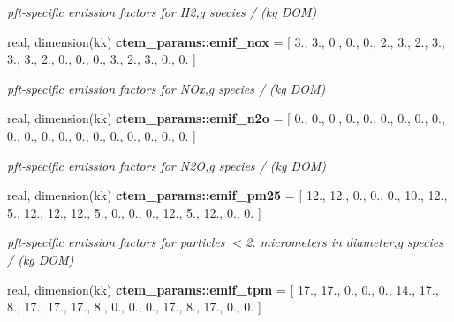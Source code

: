 \begin{DoxyCompactItemize}
\begin{DoxyCompactList}\small\item\em pft-\/specific emission factors for H2,g species / (kg D\+O\+M) \end{DoxyCompactList}\item 
\hypertarget{namespacectem__params_a1c3efd30262fdc33811b8179c691fa23}{}real, dimension(kk) {\bfseries ctem\+\_\+params\+::emif\+\_\+nox} = \mbox{[} 3., 3., 0., 0., 0., 2., 3., 2., 3., 3., 3., 2., 0., 0., 0., 3., 2., 3., 0., 0. \mbox{]}\label{namespacectem__params_a1c3efd30262fdc33811b8179c691fa23}

\begin{DoxyCompactList}\small\item\em pft-\/specific emission factors for N\+Ox,g species / (kg D\+O\+M) \end{DoxyCompactList}\item 
\hypertarget{namespacectem__params_a6b6a432b4e081591d12a9699cadd5c19}{}real, dimension(kk) {\bfseries ctem\+\_\+params\+::emif\+\_\+n2o} = \mbox{[} 0., 0., 0., 0., 0., 0., 0., 0., 0., 0., 0., 0., 0., 0., 0., 0., 0., 0., 0., 0. \mbox{]}\label{namespacectem__params_a6b6a432b4e081591d12a9699cadd5c19}

\begin{DoxyCompactList}\small\item\em pft-\/specific emission factors for N2\+O,g species / (kg D\+O\+M) \end{DoxyCompactList}\item 
\hypertarget{namespacectem__params_a89f38c6366d839a93b4cb499ecb49b6b}{}real, dimension(kk) {\bfseries ctem\+\_\+params\+::emif\+\_\+pm25} = \mbox{[} 12., 12., 0., 0., 0., 10., 12., 5., 12., 12., 12., 5., 0., 0., 0., 12., 5., 12., 0., 0. \mbox{]}\label{namespacectem__params_a89f38c6366d839a93b4cb499ecb49b6b}

\begin{DoxyCompactList}\small\item\em pft-\/specific emission factors for particles $<$2. micrometers in diameter,g species / (kg D\+O\+M) \end{DoxyCompactList}\item 
\hypertarget{namespacectem__params_a963896fb7e7da4daecc87391c68c903e}{}real, dimension(kk) {\bfseries ctem\+\_\+params\+::emif\+\_\+tpm} = \mbox{[} 17., 17., 0., 0., 0., 14., 17., 8., 17., 17., 17., 8., 0., 0., 0., 17., 8., 17., 0., 0. \mbox{]}\label{namespacectem__params_a963896fb7e7da4daecc87391c68c903e}


\end{DoxyCompactItemize}
